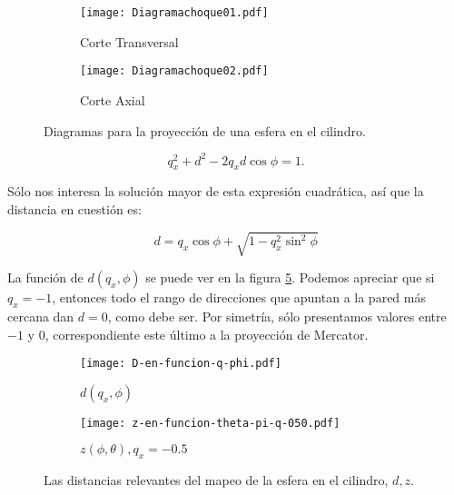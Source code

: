 \documentclass[letterpaper,12pt]{article}
\begin{document}
\begin{figure}[ht]
  \centering
  \begin{subfigure}[c]{0.4\textwidth}
    \centering
          \texttt{[image: Diagramachoque01.pdf]}
                \caption{Corte Transversal}
                \label{Diag01}
  \end{subfigure}%
\hfill
\begin{subfigure}[c]{0.4\textwidth}
    \centering
          \texttt{[image: Diagramachoque02.pdf]}
          \caption{Corte Axial}      
          \label{Diag02}
  \end{subfigure}%
\caption{Diagramas para la proyección de una esfera en el cilindro.}
\label{diagramaschoque}
\end{figure}

\begin{equation}
q_x^2+d^2-2q_x d \cos\phi=1.
\end{equation}

Sólo nos interesa la solución mayor de esta expresión cuadrática,
así que la distancia en cuestión es:

\begin{equation}\label{distanciaplano}
d=q_x \cos\phi+\sqrt{ 1- q_x^2 \sin^2 \phi } 
\end{equation}

La función de $d(q_x, \phi)$ se puede ver en la figura \ref{dgrafica}.
Podemos apreciar que si $q_x=-1$, entonces todo el rango de
direcciones que apuntan a la pared más cercana dan $d=0$, como debe ser. 
Por simetría, sólo presentamos valores entre $-1$ y $0$, correspondiente
este último a la proyección de Mercator. 

\begin{figure}[ht]
  \centering
  \begin{subfigure}[c]{0.47\textwidth}
    \centering
    \texttt{[image: D-en-funcion-q-phi.pdf]}
    \caption{ $d(q_x, \phi)$}\label{dgrafica}
  \end{subfigure}
  \hfill
  \begin{subfigure}[c]{0.47\textwidth}
    \centering
    \texttt{[image: z-en-funcion-theta-pi-q-050.pdf]}
    \caption{ $z(\phi, \theta), q_x=-0.5$}\label{dgrafica}
  \end{subfigure}
  \caption{Las distancias relevantes del mapeo de la esfera en el cilindro,
$d,z$.}\label{graficasmapeo01}
\end{figure}
    
\end{document}
